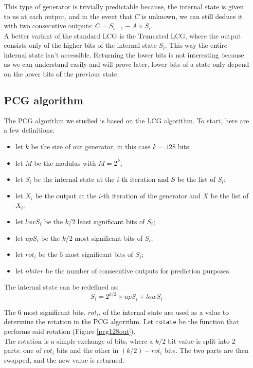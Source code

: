 \documentclass[preprint]{iacrtrans}
\begin{document}
This type of generator is trivially predictable because, the internal state is given to us at each output, and in the event that $C$ is unknown, we can still deduce it with two consecutive outputs: $C = S_{i+1} - A \times S_i$.\\

A better variant of the standard LCG is the Truncated LCG, where the output consists only of the higher bits of the internal state $S_i$. This way the entire internal state isn't accessible. Returning the lower bits is not interesting because as we can understand easily and will prove later, lower bits of a state only depend on the lower bits of the previous state.

\subsection{PCG algorithm}

The PCG algorithm we studied is based on the LCG algorithm. To start, here are a few definitions:
\begin{itemize}
    \item let $k$ be the size of our generator, in this case $k = 128$ bits;
    \item let $M$ be the modulus with $M = 2^k$;
    \item let $S_i$ be the internal state at the $i$-th iteration and $S$ be the list of $S_i$;
    \item let $X_i$ be the output at the $i$-th iteration of the generator and $X$ be the list of $X_i$;
    \item let $lowS_i$ be the $k/2$ least significant bits of $S_i$;
    \item let $upS_i$ be the $k/2$ most significant bits of $S_i$;
    \item let $rot_i$ be the 6 most significant bits of $S_i$;
    \item let $nbiter$ be the number of consecutive outputs for prediction purposes.
\end{itemize}

The internal state can be redefined as:
\begin{equation}
    S_i = 2^{k/2} \times upS_i + lowS_i 
\end{equation}

The 6 most significant bits, $rot_i$, of the internal state are used as a value to determine the rotation in the PCG algorithm. Let \texttt{rotate} be the function that performs said rotation (Figure \ref{pcg128out}).\\
The rotation is a simple exchange of bits, where a $k/2$ bit value is split into 2 parts: one of $rot_i$ bits and the other in $(k/2) - rot_i$ bits. The two parts are then swapped, and the new value is returned. 
\end{document}
